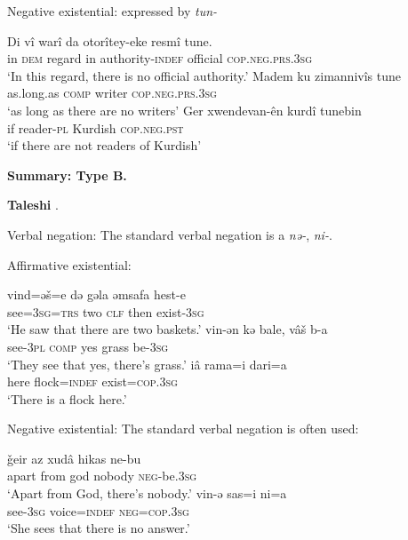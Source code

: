 ﻿\documentclass[output=paper]{langsci/langscibook}
\begin{document}
\begin{unindented}
Negative existential: expressed by \textit{tun-} 
%
\begin{exe}\ex \gll Di vî warî    da otorîtey-eke resmî   tune.  \\
in  \textsc{dem}    regard in  authority-\textsc{indef}  official \textsc{cop.neg.prs.3sg} \\
    \glt `In this regard, there is no official authority.' \citep[32]{Thackston2006}
\ex \gll Madem ku zimannivîs tune \\
as.long.as  \textsc{comp}    writer \textsc{cop.neg.prs.3sg} \\
    \glt `as long as there are no writers' \citep[32]{Thackston2006}
\ex \gll Ger xwendevan-ên kurdî tunebin \\
if reader-\textsc{pl} Kurdish  \textsc{cop.neg.pst} \\
    \glt `if there are not readers of Kurdish' \citep[31]{Thackston2006}
    \end{exe}

\textbf{Summary: Type B.}

\textbf{Taleshi} \parencite{Paul2011}. 

Verbal negation: The standard verbal negation is a \textit{nə-}, \textit{ni-}.

Affirmative existential:
%
\begin{exe}\ex
    \gll vind=əš=e də   gəla əmsafa hest-e \\
see=\textsc{3sg}=\textsc{trs} two \textsc{clf} then exist-\textsc{3sg} \\
    \glt `He saw that there are two baskets.' \citep[358]{Paul2011}
\ex \gll vin-ən kə bale, vâš    b-a \\
see-\textsc{3pl} \textsc{comp}     yes   grass be-\textsc{3sg} \\
    \glt `They see that yes, there's grass.' \citep[210]{Paul2011}
\ex \gll iâ rama=i dari=a \\
here flock=\textsc{indef} exist=\textsc{cop.3sg} \\
    \glt `There is a flock here.' \citep[243]{Paul2011}
    \end{exe}

Negative existential: The standard verbal negation is often used:
%
\begin{exe}\ex \gll ǧeir   az   xudâ hikas    ne-bu \\
apart  from  god   nobody \textsc{neg}-be.\textsc{3sg} \\
    \glt `Apart from God, there's nobody.' \citep[176]{Paul2011}
\ex \gll vin-ə sas=i ni=a \\
see-\textsc{3sg} voice=\textsc{indef}  \textsc{neg=cop.3sg} \\
    \glt `She sees that there is no answer.' \citep[422]{Paul2011}
    \end{exe}


\end{unindented}
\end{document}
